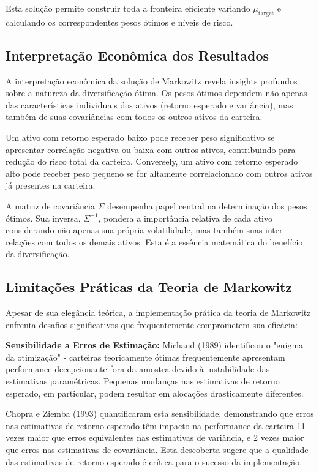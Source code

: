 Esta solução permite construir toda a fronteira eficiente variando $\mu_{\text{target}}$ e calculando os correspondentes pesos ótimos e níveis de risco.

\subsection{Interpretação Econômica dos Resultados}

A interpretação econômica da solução de Markowitz revela insights profundos sobre a natureza da diversificação ótima. Os pesos ótimos dependem não apenas das características individuais dos ativos (retorno esperado e variância), mas também de suas covariâncias com todos os outros ativos da carteira.

Um ativo com retorno esperado baixo pode receber peso significativo se apresentar correlação negativa ou baixa com outros ativos, contribuindo para redução do risco total da carteira. Conversely, um ativo com retorno esperado alto pode receber peso pequeno se for altamente correlacionado com outros ativos já presentes na carteira.

A matriz de covariância $\Sigma$ desempenha papel central na determinação dos pesos ótimos. Sua inversa, $\Sigma^{-1}$, pondera a importância relativa de cada ativo considerando não apenas sua própria volatilidade, mas também suas inter-relações com todos os demais ativos. Esta é a essência matemática do benefício da diversificação.

\subsection{Limitações Práticas da Teoria de Markowitz}

Apesar de sua elegância teórica, a implementação prática da teoria de Markowitz enfrenta desafios significativos que frequentemente comprometem sua eficácia:

\textbf{Sensibilidade a Erros de Estimação:} Michaud (1989) identificou o "enigma da otimização" - carteiras teoricamente ótimas frequentemente apresentam performance decepcionante fora da amostra devido à instabilidade das estimativas paramétricas. Pequenas mudanças nas estimativas de retorno esperado, em particular, podem resultar em alocações drasticamente diferentes.

Chopra e Ziemba (1993) quantificaram esta sensibilidade, demonstrando que erros nas estimativas de retorno esperado têm impacto na performance da carteira 11 vezes maior que erros equivalentes nas estimativas de variância, e 2 vezes maior que erros nas estimativas de covariância. Esta descoberta sugere que a qualidade das estimativas de retorno esperado é crítica para o sucesso da implementação.

